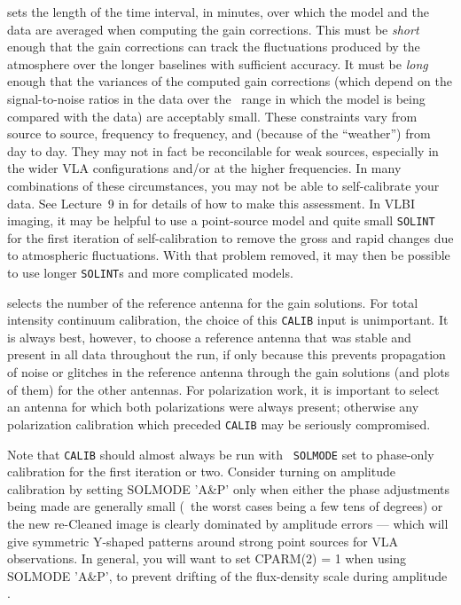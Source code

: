     {\tt {}} sets the length of the time interval, in
minutes, over which the model and the data are averaged when computing
the gain corrections.  This must be {\it short\/} enough that the gain
corrections can track the fluctuations produced by the atmosphere over
the longer baselines with sufficient accuracy.  It must be {\it long\/}
enough that the variances of the computed gain corrections (which
depend on the signal-to-noise ratios in the data over the \uv\ range
in which the model is being compared with the data) are acceptably
small.  These constraints vary from source to source, frequency to
frequency, and (because of the ``weather'') from day to day.  They may
not in fact be reconcilable for weak sources, especially in the wider
VLA configurations and/or at the higher frequencies.  In many
combinations of these circumstances, you may not be able to
self-calibrate your data.  See Lecture~9 in {\it {}\/} for details of how to make this
assessment.  In VLBI imaging, it may be helpful to use a point-source
model and quite small {\tt SOLINT} for the first iteration of
self-calibration to remove the gross and rapid changes due to
atmospheric fluctuations.  With that problem removed, it may then be
possible to use longer {\tt SOLINT}s and more complicated models.

    {\tt {}} selects the number of the reference antenna
for the gain solutions.  For total intensity continuum calibration,
the choice of this {\tt CALIB} input is unimportant.  It is always
best, however, to choose a reference antenna that was stable and
present in all data throughout the run, if only because this prevents
propagation of noise or glitches in the reference antenna through the
gain solutions (and plots of them) for the other antennas.  For
polarization work, it is important to select an antenna for which both
polarizations were always present; otherwise any polarization
calibration which preceded {\tt CALIB} may be seriously compromised.

     Note that {\tt CALIB} should almost always be run with {\tt
SOLMODE} set to phase-only calibration for the first iteration or two.
Consider turning on amplitude calibration by setting {\us SOLMODE
'A\&P' } only when either the phase adjustments being made are
generally small (\ie\ the worst cases being a few tens of degrees) or
the new re-Cleaned image is clearly dominated by amplitude errors ---
which will give symmetric Y-shaped patterns around strong point
sources for VLA observations.  In general, you will want to set {\us
CPARM(2) = 1} when using {\us SOLMODE 'A\&P'}, to prevent drifting of
the flux-density scale during amplitude .

